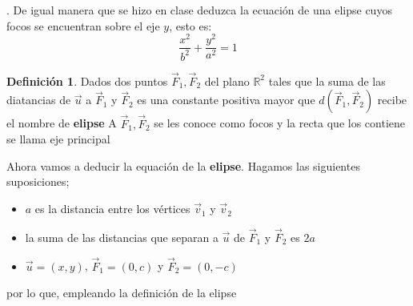 \documentclass[letterpaper]{article}
\newcommand{\R}{\mathds{R}}
\renewcommand{\*}{\cdot}
\theoremstyle{definition}
\newtheorem{definition}{Definición}
\begin{document}
	\newpage
	. De igual manera que se hizo en clase deduzca la ecuación de una elipse cuyos focos se encuentran sobre el eje $y$, esto es: $$\dfrac{x^2}{b^2} + \dfrac{y^2}{a^2}=1$$
	\begin{definition}
		Dados dos puntos $ \vec{F}_1, \vec{F}_2 $ del plano $ \R^2 $ tales que la suma de las diatancias de $ \vec{u} $ a $ \vec{F}_1 $ y $ \vec{F}_2 $ es una constante positiva mayor que $ d( \vec{F}_1, \vec{F}_2) $ recibe el nombre de \textbf{elipse}
		A $ \vec{F}_1, \vec{F}_2 $ se les conoce como focos y la recta que los contiene se llama eje principal
 	\end{definition}
 Ahora vamos a deducir la equación de la \textbf{elipse}.
 Hagamos las siguientes suposiciones; 
 \begin{itemize}
 	\item $ a $ es la distancia entre los vértices $ \vec{v}_1 $ y $ \vec{v}_2 $
 	\item la suma de las distancias que separan a $ \vec{u} $ de $ \vec{F}_1 $ y $ \vec{F}_2 $ es $ 2a $
 	\item $ \vec{u} = (x,y) $, $ \vec{F}_1 = (0,c) $ y $ \vec{F}_2 = ( 0,-c) $ 
 \end{itemize}
por lo que, empleando la definición de la elipse
\end{document}
